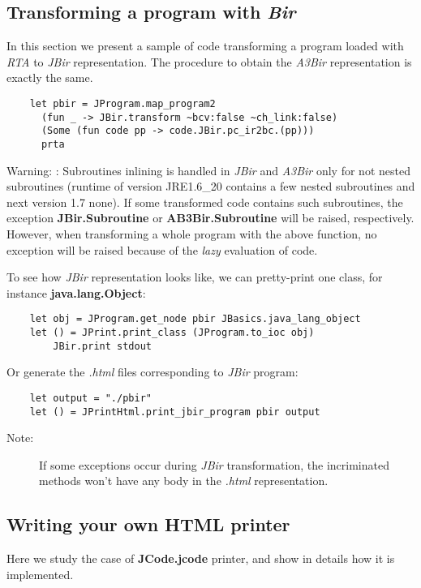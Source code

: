 \documentclass{article}
\begin{document}
\subsection{Transforming a program with \emph{Bir}}

In this section we present a sample of code transforming a program
loaded with \emph{RTA} to \emph{JBir} representation. The procedure
to obtain the \emph{A3Bir} representation is exactly the same.

\begin{verbatim}
    let pbir = JProgram.map_program2
      (fun _ -> JBir.transform ~bcv:false ~ch_link:false) 
      (Some (fun code pp -> code.JBir.pc_ir2bc.(pp)))
      prta
\end{verbatim}
Warning: : Subroutines inlining is handled in \emph{JBir} and
\emph{A3Bir} only for not nested subroutines (runtime of version
JRE1.6\_20 contains a few nested subroutines and next version 1.7
none). If some transformed code contains such subroutines, the
exception \textbf{JBir.Subroutine} or \textbf{AB3Bir.Subroutine}
will be raised, respectively. However, when transforming a whole
program with the above function, no exception will be raised
because of the \emph{lazy} evaluation of code.

To see how \emph{JBir} representation looks like, we can
pretty-print one class, for instance \textbf{java.lang.Object}:

\begin{verbatim}
    let obj = JProgram.get_node pbir JBasics.java_lang_object
    let () = JPrint.print_class (JProgram.to_ioc obj)
        JBir.print stdout
\end{verbatim}
Or generate the \emph{.html} files corresponding to \emph{JBir}
program:

\begin{verbatim}
    let output = "./pbir"
    let () = JPrintHtml.print_jbir_program pbir output
\end{verbatim}
\begin{description}
\item[Note:]
If some exceptions occur during \emph{JBir} transformation, the
incriminated methods won't have any body in the \emph{.html}
representation.
\end{description}
\subsection{Writing your own HTML printer}

Here we study the case of \textbf{JCode.jcode} printer, and show in
details how it is implemented.
\end{document}
